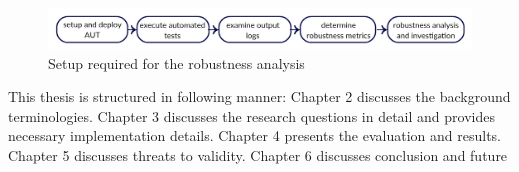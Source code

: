 \begin{figure}[h]
	\centering	\includegraphics[width=\textwidth]{./Figures/thesisoverviewsmall.jpg}
	\caption{Setup required for the robustness analysis}
	\label{fig:thesisoverview}
\end{figure} 

This thesis is structured in following manner: Chapter 2 discusses the background terminologies. Chapter 3 discusses the research questions in detail and provides necessary implementation details. Chapter 4 presents the evaluation and results. Chapter 5 discusses threats to validity. Chapter 6 discusses conclusion and future

